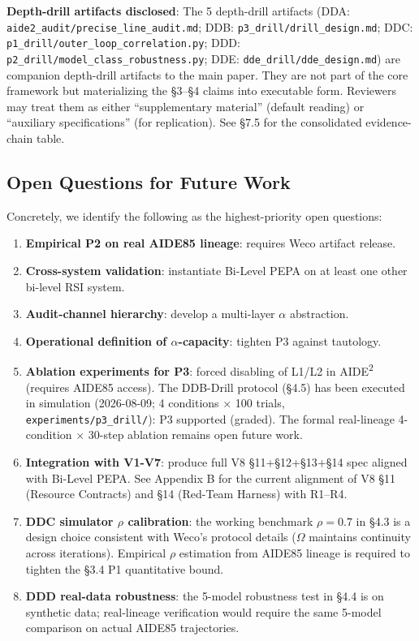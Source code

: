 \documentclass{article}
\theoremstyle{definition}
\begin{document}
\textbf{Depth-drill artifacts disclosed}: The 5 depth-drill artifacts (DDA: \texttt{aide2\_audit/precise\_line\_audit.md}; DDB: \texttt{p3\_drill/drill\_design.md}; DDC: \texttt{p1\_drill/outer\_loop\_correlation.py}; DDD: \texttt{p2\_drill/model\_class\_robustness.py}; DDE: \texttt{dde\_drill/dde\_design.md}) are companion depth-drill artifacts to the main paper. They are not part of the core framework but materializing the \S3--\S4 claims into executable form. Reviewers may treat them as either ``supplementary material'' (default reading) or ``auxiliary specifications'' (for replication). See \S7.5 for the consolidated evidence-chain table.

\subsection{Open Questions for Future Work}

Concretely, we identify the following as the highest-priority open questions:
\begin{enumerate}
    \item \textbf{Empirical P2 on real AIDE85 lineage}: requires Weco artifact release.
    \item \textbf{Cross-system validation}: instantiate Bi-Level PEPA on at least one other bi-level RSI system.
    \item \textbf{Audit-channel hierarchy}: develop a multi-layer $\alpha$ abstraction.
    \item \textbf{Operational definition of $\alpha$-capacity}: tighten P3 against tautology.
    \item \textbf{Ablation experiments for P3}: forced disabling of L1/L2 in AIDE\textsuperscript{2} (requires AIDE85 access). The DDB-Drill protocol (\S4.5) has been executed in simulation (2026-08-09; 4 conditions $\times$ 100 trials, \texttt{experiments/p3\_drill/}): P3 supported (graded). The formal real-lineage 4-condition $\times$ 30-step ablation remains open future work.
    \item \textbf{Integration with V1-V7}: produce full V8 \S11+\S12+\S13+\S14 spec aligned with Bi-Level PEPA. See Appendix B for the current alignment of V8 \S11 (Resource Contracts) and \S14 (Red-Team Harness) with R1--R4.
    \item \textbf{DDC simulator $\rho$ calibration}: the working benchmark $\rho = 0.7$ in \S4.3 is a design choice consistent with Weco's protocol details ($\Omega$ maintains continuity across iterations). Empirical $\rho$ estimation from AIDE85 lineage is required to tighten the \S3.4 P1 quantitative bound.
    \item \textbf{DDD real-data robustness}: the 5-model robustness test in \S4.4 is on synthetic data; real-lineage verification would require the same 5-model comparison on actual AIDE85 trajectories.
\end{enumerate}
\end{document}
